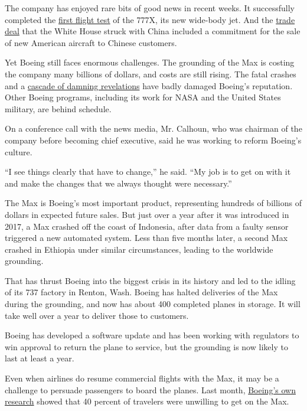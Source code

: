 The company has enjoyed rare bits of good news in recent weeks. It
successfully completed the
\href{https://www.nytimes3xbfgragh.onion/reuters/2020/01/25/business/25reuters-boeing-777x-landing.html}{first
flight test} of the 777X, its new wide-body jet. And the
\href{https://www.nytimes3xbfgragh.onion/2020/01/15/business/economy/china-trade-deal.html}{trade
deal} that the White House struck with China included a commitment for
the sale of new American aircraft to Chinese customers.

Yet Boeing still faces enormous challenges. The grounding of the Max is
costing the company many billions of dollars, and costs are still
rising. The fatal crashes and a
\href{https://www.nytimes3xbfgragh.onion/2020/01/10/business/boeing-737-employees-messages.html}{cascade
of damning revelations} have badly damaged Boeing's reputation. Other
Boeing programs, including its work for NASA and the United States
military, are behind schedule.

On a conference call with the news media, Mr. Calhoun, who was chairman
of the company before becoming chief executive, said he was working to
reform Boeing's culture.

``I see things clearly that have to change,'' he said. ``My job is to
get on with it and make the changes that we always thought were
necessary.''

The Max is Boeing's most important product, representing hundreds of
billions of dollars in expected future sales. But just over a year after
it was introduced in 2017, a Max crashed off the coast of Indonesia,
after data from a faulty sensor triggered a new automated system. Less
than five months later, a second Max crashed in Ethiopia under similar
circumstances, leading to the worldwide grounding.

That has thrust Boeing into the biggest crisis in its history and led to
the idling of its 737 factory in Renton, Wash. Boeing has halted
deliveries of the Max during the grounding, and now has about 400
completed planes in storage. It will take well over a year to deliver
those to customers.

Boeing has developed a software update and has been working with
regulators to win approval to return the plane to service, but the
grounding is now likely to last at least a year.

Even when airlines do resume commercial flights with the Max, it may be
a challenge to persuade passengers to board the planes. Last month,
\href{https://www.nytimes3xbfgragh.onion/2019/12/24/business/boeing-737-max-survey.html}{Boeing's
own research} showed that 40 percent of travelers were unwilling to get
on the Max.

